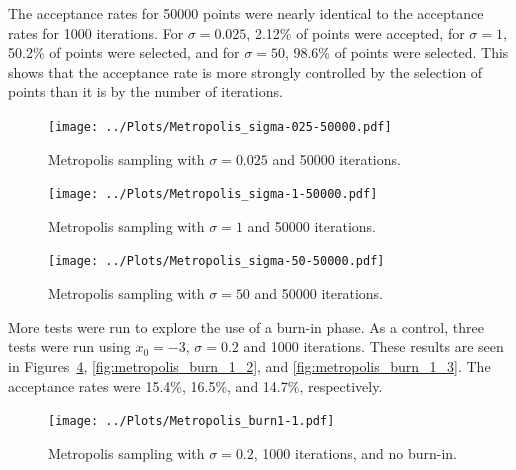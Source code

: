\documentclass[twocolumn]{myarticle}
\begin{document}
The acceptance rates for 50000 points were nearly identical to the acceptance rates for 1000 iterations.
For $ \sigma = 0.025 $, 2.12\% of points were accepted, for $ \sigma = 1 $, 50.2\% of points were selected, and for $ \sigma = 50 $, 98.6\% of points were selected.
This shows that the acceptance rate is more strongly controlled by the selection of points than it is by the number of iterations.

\begin{figure}[ht!]
    \begin{center}
    \texttt{[image: ../Plots/Metropolis\_sigma-025-50000.pdf]}
    \caption{%
    Metropolis sampling with $ \sigma = 0.025 $ and 50000 iterations.
    }
    \label{fig:metropolis_sigma_025_50000}
    \end{center}
\end{figure}

\begin{figure}[ht!]
    \begin{center}
    \texttt{[image: ../Plots/Metropolis\_sigma-1-50000.pdf]}
    \caption{%
    Metropolis sampling with $ \sigma = 1 $ and 50000 iterations.
    }
    \label{fig:metropolis_sigma_1_50000}
    \end{center}
\end{figure}

\begin{figure}[ht!]
    \begin{center}
    \texttt{[image: ../Plots/Metropolis\_sigma-50-50000.pdf]}
    \caption{%
    Metropolis sampling with $ \sigma = 50 $ and 50000 iterations.
    }
    \label{fig:metropolis_sigma_50_50000}
    \end{center}
\end{figure}

More tests were run to explore the use of a burn-in phase.
As a control, three tests were run using $ x_0 = -3 $, $ \sigma = 0.2 $ and 1000 iterations.
These results are seen in Figures~\ref{fig:metropolis_burn_1_1}, \ref{fig:metropolis_burn_1_2}, and \ref{fig:metropolis_burn_1_3}.
The acceptance rates were 15.4\%, 16.5\%, and 14.7\%, respectively.

\begin{figure}[ht!]
    \begin{center}
    \texttt{[image: ../Plots/Metropolis\_burn1-1.pdf]}
    \caption{%
    Metropolis sampling with $ \sigma = 0.2 $, 1000 iterations, and no burn-in.
    }
    \label{fig:metropolis_burn_1_1}
    \end{center}
\end{figure}
\end{document}
